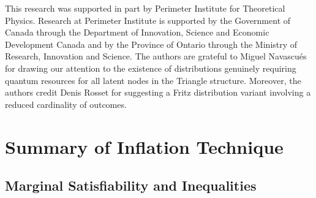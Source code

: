 \documentclass[aps, 10pt, english, twoside, pra, nofootinbib, tightenlines, longbibliography, superscriptaddress]{revtex4-1}
\begin{document}
    \begin{acknowledgments}
    This research was supported in part by Perimeter Institute for Theoretical Physics. Research at Perimeter Institute is supported by the Government of Canada through the Department of Innovation, Science and Economic Development Canada and by the Province of Ontario through the Ministry of Research, Innovation and Science. The authors are grateful to Miguel Navascués for drawing our attention to the existence of distributions genuinely requiring quantum resources for all latent nodes in the Triangle structure. Moreover, the authors credit Denis Rosset for suggesting a Fritz distribution variant involving a reduced cardinality of outcomes.
    \end{acknowledgments}

    \appendix

    \section{Summary of Inflation Technique}
    \label{sec:inflation_technique}


    \subsection{Marginal Satisfiability and Inequalities}
    \label{sec:marginal_satisfiability}
    \label{sec:marginal_linear}\label{sec:linear_programs}
\end{document}

